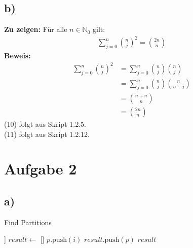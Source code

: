 \documentclass[a4paper]{scrartcl}
\begin{document}
\subsection*{b)}
\textbf{Zu zeigen:} Für alle $ n \in \mathbb{N}_0$ gilt:
\begin{align*}
    \sum_{j=0}^{n} \binom{n}{j}^2 = \binom{2n}{n}
\end{align*}
\textbf{Beweis:} 
\begin{align}
    \sum_{j=0}^{n} \binom{n}{j}^2 &= \sum_{j=0}^{n} \binom{n}{j} \binom{n}{j} \\
    &= \sum_{j=0}^{n} \binom{n}{j} \binom{n}{n-j} \\
    &= \binom{n+n}{n} \\
    &= \binom{2n}{n}
\end{align}
(10) folgt aus Skript 1.2.5. \\
(11) folgt aus Skript 1.2.12. 

\section*{Aufgabe 2}
\subsection*{a)}
\begin{algorithm}
\caption{Find Partitions}\label{euclid}
\begin{algorithmic}[1]
        \Return [[n]] 
    \EndIf
    \State $result \gets$ []
                \State $p.\text{push}(i)$
                \State $result.\text{push}(p)$
            \EndIf
        \EndFor
    \EndFor
    \State \Return $result$
    \EndProcedure
\end{algorithmic}
\end{algorithm}
\newpage
\end{document}
